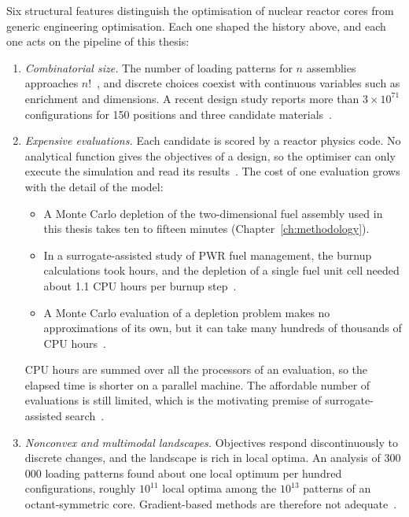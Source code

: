 Six structural features distinguish the optimisation of nuclear reactor
cores from generic engineering optimisation. Each one shaped the history above, and each
one acts on the pipeline of this thesis:

\begin{enumerate}
  \item \emph{Combinatorial size.} The number of loading patterns for
        $n$ assemblies approaches $n!$~\cite{stewart_2021}, and discrete
        choices coexist with continuous variables such as enrichment and
        dimensions. A recent design study reports more than
        $3\times10^{71}$ configurations for 150 positions and three
        candidate materials~\cite{pevey_2022}.

  \item \emph{Expensive evaluations.} Each candidate is scored by a
        reactor physics code. No analytical function gives the objectives
        of a design, so the optimiser can only execute the simulation and
        read its results~\cite{jin_2011}. The cost of one evaluation grows
        with the
        detail of the model:

        \begin{itemize}
          \item A Monte Carlo depletion of the two-dimensional fuel
                assembly used in this thesis takes ten to fifteen minutes (Chapter~\ref{ch:methodology}).

          \item In a surrogate-assisted study of PWR fuel management, the
                burnup calculations took hours, and the depletion of a
                single fuel unit cell needed about 1.1 CPU hours per burnup
                step~\cite{whyte_2020}.

          \item A Monte Carlo evaluation of a depletion problem makes no
                approximations of its own, but it can take many hundreds
                of thousands of CPU hours~\cite{josey_2017}.
        \end{itemize}

        CPU hours are summed over all the processors of an evaluation, so the
        elapsed time is shorter on a parallel machine. The affordable
        number of evaluations is still limited, which is the motivating
        premise of surrogate-assisted search~\cite{jin_2011}.

  \item \emph{Nonconvex and multimodal landscapes.} Objectives respond
        discontinuously to discrete changes, and the landscape is rich in
        local optima. An analysis of 300\,000 loading patterns found
        about one local optimum per hundred configurations, roughly
        $10^{11}$ local optima among the $10^{13}$ patterns of an
        octant-symmetric core. Gradient-based methods are therefore not
        adequate~\cite{meneses_2010}.


\end{enumerate}
